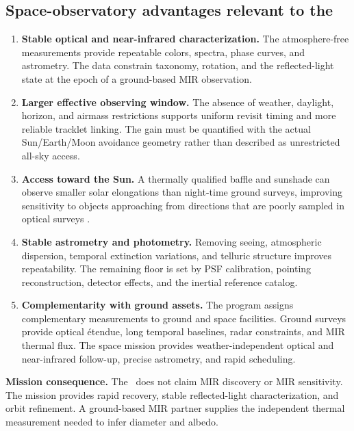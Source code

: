 \clearpage
\subsection{Space-observatory advantages relevant to the \facility}

\begin{enumerate}[leftmargin=7mm,itemsep=2mm]
\item \textbf{\color{cTeal}Stable optical and near-infrared characterization.}
The atmosphere-free measurements provide repeatable colors, spectra, phase
curves, and astrometry. The data constrain taxonomy, rotation, and the
reflected-light state at the epoch of a ground-based MIR observation.
\item \textbf{\color{cGold}Larger effective observing window.}
The absence of weather, daylight, horizon, and airmass restrictions supports
uniform revisit timing and more reliable tracklet linking. The gain must be
quantified with the actual Sun/Earth/Moon avoidance geometry rather than
described as unrestricted all-sky access.
\item \textbf{\color{cOrange}Access toward the Sun.}
A thermally qualified baffle and sunshade can observe smaller solar
elongations than night-time ground surveys, improving sensitivity to objects
approaching from directions that are poorly sampled in optical surveys
\cite{Mainzer2023}.
\item \textbf{\color{cBlue}Stable astrometry and photometry.}
Removing seeing, atmospheric dispersion, temporal extinction variations, and telluric
structure improves repeatability. The remaining floor is set by PSF
calibration, pointing reconstruction, detector effects, and the inertial
reference catalog.
\item \textbf{\color{cRed}Complementarity with ground assets.}
The program assigns complementary measurements to ground and space
facilities. Ground surveys provide optical étendue, long temporal baselines,
radar constraints, and MIR thermal flux. The space mission provides
weather-independent optical and near-infrared follow-up, precise astrometry,
and rapid scheduling.
\end{enumerate}

\begin{resultbox}
\textbf{\color{cGold}Mission consequence.}
The \facility\ does not claim MIR discovery or MIR sensitivity. The mission
provides rapid recovery, stable reflected-light characterization, and orbit
refinement. A ground-based MIR partner supplies the independent
thermal measurement needed to infer diameter and albedo.
\end{resultbox}

